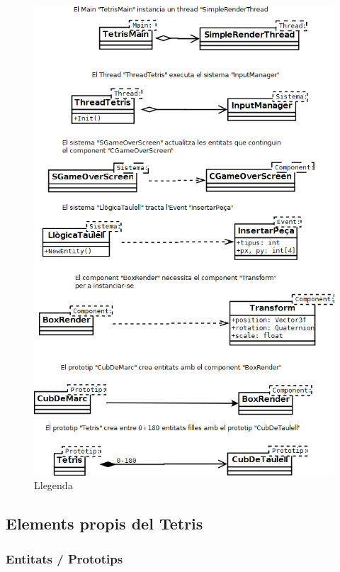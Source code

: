 \begin{figure}
  \includegraphics[width=1\linewidth]{./img/GuiaDiagramaQuadriga.png}
  \caption{Llegenda \label{fig:GuiaDiagramaQuadriga}}
\end{figure}

\subsection{Elements propis del Tetris}

  \subsubsection{Entitats / Prototips}

